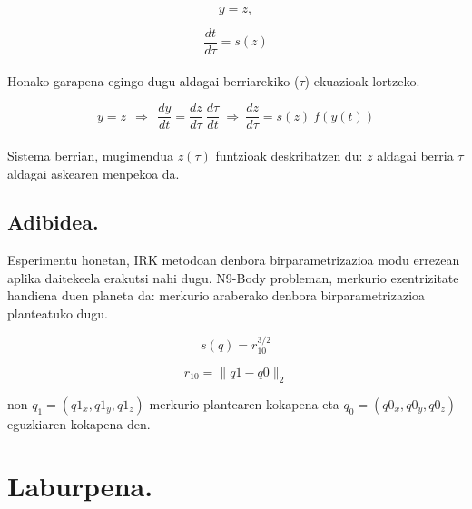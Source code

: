 \begin{equation*}
y=z,
\end{equation*}

\begin{equation*}
\frac{dt}{d\tau}=s(z)
\end{equation*}

\paragraph*{} Honako garapena egingo dugu aldagai berriarekiko ($\tau$) ekuazioak lortzeko.

\begin{equation*}
y=z \ \ \Rightarrow \ \ \frac{dy}{dt}=\frac{dz}{d \tau} \ \frac{d \tau}{dt} \ \Rightarrow \ \frac{dz}{d \tau}= s(z) \ f(y(t)) 
\end{equation*}

\paragraph*{} Sistema berrian, mugimendua $z(\tau)$ funtzioak deskribatzen du: $z$ aldagai berria $\tau$ aldagai askearen menpekoa da. 

\subsection{Adibidea.}

Esperimentu honetan, IRK metodoan denbora birparametrizazioa modu errezean aplika daitekeela erakutsi nahi dugu. N9-Body probleman, merkurio ezentrizitate handiena duen planeta da: merkurio araberako denbora birparametrizazioa planteatuko dugu.

\begin{equation}
s(q)=r_{10}^{3/2}
\end{equation}

\begin{equation}
r_{10}=\|q1-q0\|_2
\end{equation}

non $q_1=(q1_{x},q1_{y},q1_{z})$ merkurio plantearen kokapena eta $q_0=(q0_{x},q0_{y},q0_{z})$ eguzkiaren kokapena den.

\section{Laburpena.}